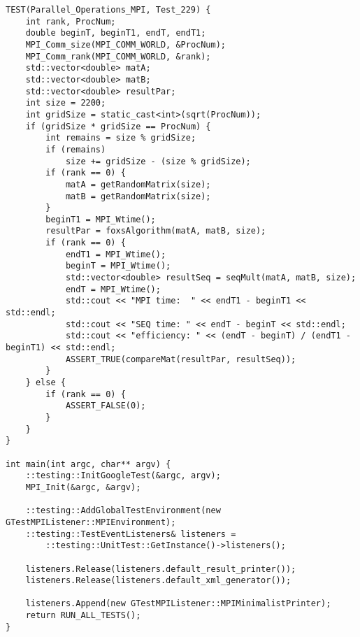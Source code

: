 \documentclass{report}
\begin{document}
\begin{lstlisting}
TEST(Parallel_Operations_MPI, Test_229) {
    int rank, ProcNum;
    double beginT, beginT1, endT, endT1;
    MPI_Comm_size(MPI_COMM_WORLD, &ProcNum);
    MPI_Comm_rank(MPI_COMM_WORLD, &rank);
    std::vector<double> matA;
    std::vector<double> matB;
    std::vector<double> resultPar;
    int size = 2200;
    int gridSize = static_cast<int>(sqrt(ProcNum));
    if (gridSize * gridSize == ProcNum) {
        int remains = size % gridSize;
        if (remains)
            size += gridSize - (size % gridSize);
        if (rank == 0) {
            matA = getRandomMatrix(size);
            matB = getRandomMatrix(size);
        }
        beginT1 = MPI_Wtime();
        resultPar = foxsAlgorithm(matA, matB, size);
        if (rank == 0) {
            endT1 = MPI_Wtime();
            beginT = MPI_Wtime();
            std::vector<double> resultSeq = seqMult(matA, matB, size);
            endT = MPI_Wtime();
            std::cout << "MPI time:  " << endT1 - beginT1 << std::endl;
            std::cout << "SEQ time: " << endT - beginT << std::endl;
            std::cout << "efficiency: " << (endT - beginT) / (endT1 - beginT1) << std::endl;
            ASSERT_TRUE(compareMat(resultPar, resultSeq));
        }
    } else {
        if (rank == 0) {
            ASSERT_FALSE(0);
        }
    }
}

int main(int argc, char** argv) {
    ::testing::InitGoogleTest(&argc, argv);
    MPI_Init(&argc, &argv);

    ::testing::AddGlobalTestEnvironment(new GTestMPIListener::MPIEnvironment);
    ::testing::TestEventListeners& listeners =
        ::testing::UnitTest::GetInstance()->listeners();

    listeners.Release(listeners.default_result_printer());
    listeners.Release(listeners.default_xml_generator());

    listeners.Append(new GTestMPIListener::MPIMinimalistPrinter);
    return RUN_ALL_TESTS();
}

\end{lstlisting}
\end{document}
